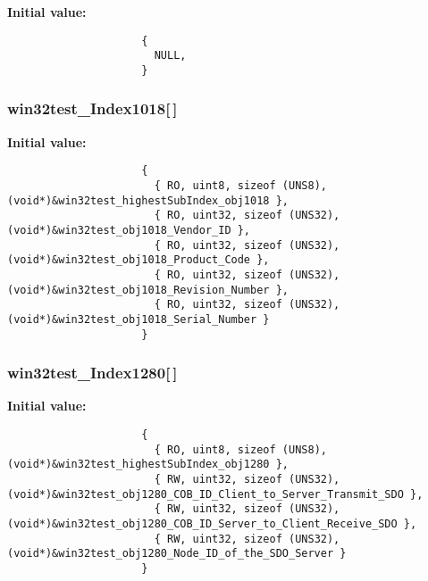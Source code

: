 \textbf{Initial value:}

\begin{Code}\begin{verbatim} 
                     {
                       NULL,
                     }
\end{verbatim}\end{Code}
\subsubsection{ {\bf win32test\_\-Index1018}[$\,$]}\label{win32test_8c_4d55483b81ea7ccc19a4aa1665e86b7f}


\textbf{Initial value:}

\begin{Code}\begin{verbatim} 
                     {
                       { RO, uint8, sizeof (UNS8), (void*)&win32test_highestSubIndex_obj1018 },
                       { RO, uint32, sizeof (UNS32), (void*)&win32test_obj1018_Vendor_ID },
                       { RO, uint32, sizeof (UNS32), (void*)&win32test_obj1018_Product_Code },
                       { RO, uint32, sizeof (UNS32), (void*)&win32test_obj1018_Revision_Number },
                       { RO, uint32, sizeof (UNS32), (void*)&win32test_obj1018_Serial_Number }
                     }
\end{verbatim}\end{Code}
\subsubsection{ {\bf win32test\_\-Index1280}[$\,$]}\label{win32test_8c_3a14f70d5c0ddf7d9f29acc21f935395}


\textbf{Initial value:}

\begin{Code}\begin{verbatim} 
                     {
                       { RO, uint8, sizeof (UNS8), (void*)&win32test_highestSubIndex_obj1280 },
                       { RW, uint32, sizeof (UNS32), (void*)&win32test_obj1280_COB_ID_Client_to_Server_Transmit_SDO },
                       { RW, uint32, sizeof (UNS32), (void*)&win32test_obj1280_COB_ID_Server_to_Client_Receive_SDO },
                       { RW, uint32, sizeof (UNS32), (void*)&win32test_obj1280_Node_ID_of_the_SDO_Server }
                     }
\end{verbatim}\end{Code}
